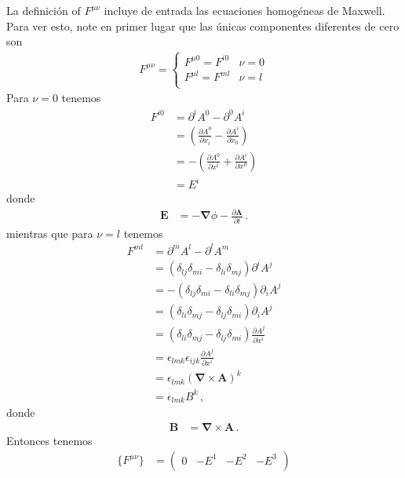 \begin{frame}
La  definición of $F^{\mu\nu}$ incluye de entrada las ecuaciones
homogéneas de Maxwell. Para ver esto, note en primer lugar que las
únicas componentes diferentes de  cero son
\begin{align}
  F^{\mu\nu}=  \begin{cases}
    F^{\mu0}=F^{i0} & \text{$\nu=0$}\\
    F^{\mu l}=F^{ml} & \text{$\nu=l$}\\
  \end{cases}
\end{align}
Para $\nu=0$ tenemos
\begin{align}
F^{i0}  &=\partial^{i}A^0-\partial^0 A^{i}\nonumber\\
  &=(\frac{\partial A^0}{\partial x_i}-\frac{\partial A^{i}}{\partial x_0})\nonumber\\
&=-(\frac{\partial A^0}{\partial x^{i}}+\frac{\partial A^{i}}{\partial x^0})\nonumber\\
&=E^i
\end{align}
donde
\begin{align}
\label{eq:173qft}
   \mathbf{E}&=-\boldsymbol{\nabla}\phi-\frac{\partial\mathbf{A}}{\partial t}\,.
\end{align}
mientras que para $\nu=l$ tenemos
\begin{align}
F^{ml}  &=\partial^m A^l-\partial^l A^m\nonumber\\
  &=(\delta_{lj}\delta_{mi}-\delta_{li}\delta_{mj}){\partial^iA^j}\nonumber\\
  &=-(\delta_{lj}\delta_{mi}-\delta_{li}\delta_{mj}){\partial_iA^j}\nonumber\\
  &=(\delta_{li}\delta_{mj}-\delta_{lj}\delta_{mi}){\partial_iA^j}\nonumber\\
  &=(\delta_{li}\delta_{mj}-\delta_{lj}\delta_{mi})\frac{\partial A^j}{\partial x^{i}}\nonumber\\
    &=\epsilon_{lmk}\epsilon_{ijk}\frac{\partial A^j}{\partial x^{i}}\nonumber\\
&=\epsilon_{lmk}\left(\boldsymbol{\nabla}\times  \mathbf{A}\right)^k\nonumber\\
&=\epsilon_{lmk}B^k\,,
\end{align}
donde
\begin{align}
\label{eq:174qft}
  \mathbf{B}&=\boldsymbol{\nabla}\times \mathbf{A}\,.
\end{align}
Entonces tenemos
\begin{align}
  \{F^{\mu\nu}\}  &=
  \begin{pmatrix}
    0 &-E^1   &-E^2   &-E^3   \\    

\end{pmatrix}
\end{align}
\end{frame}
